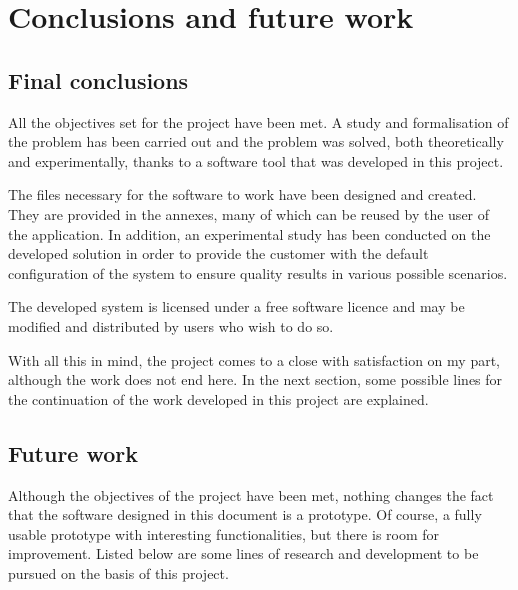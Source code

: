 \renewcommand{\documentname}{Conclusions and future work}

\chapter{Conclusions and future work}

\section{Final conclusions}

All the objectives set for the project have been met. A study and formalisation of the problem has been carried out and the problem was solved, both theoretically and experimentally, thanks to a software tool that was developed in this project.

The files necessary for the software to work have been designed and created. They are provided in the annexes, many of which can be reused by the user of the application. In addition, an experimental study has been conducted on the developed solution in order to provide the customer with the default configuration of the system to ensure quality results in various possible scenarios.

The developed system is licensed under a free software licence and may be modified and distributed by users who wish to do so.

With all this in mind, the project comes to a close with satisfaction on my part, although the work does not end here. In the next section, some possible lines for the continuation of the work developed in this project are explained.


\section{Future work}

Although the objectives of the project have been met, nothing changes the fact that the software designed in this document is a prototype. Of course, a fully usable prototype with interesting functionalities, but there is room for improvement. Listed below are some lines of research and development to be pursued on the basis of this project.


